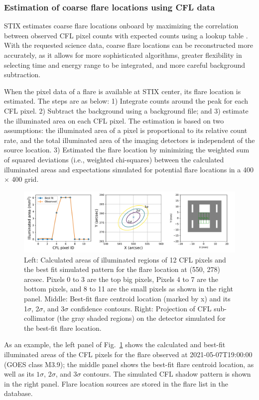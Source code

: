 \documentclass[referee]{aa} %
\begin{document}
\subsubsection{Estimation of coarse flare locations using CFL data}
STIX estimates coarse flare locations onboard by 
maximizing the correlation between observed CFL pixel counts with expected counts using a lookup table \cite{stix2020}. 
With the requested science data, coarse flare locations can be reconstructed more accurately, as it allows for more sophisticated algorithms, greater flexibility in selecting time and energy range to be integrated, and more careful background subtraction.

When the pixel data of a flare is available at STIX center, its flare location is estimated. The steps are as below: 
1) Integrate counts around the peak for each CFL pixel. 
2) Subtract the background using a background file; and 3) estimate the illuminated area on each CFL pixel.  The estimation is based on two assumptions:  the illuminated area of a pixel is proportional to its relative count rate, and the total illuminated area of the imaging detectors is independent of the source location.
3) Estimated the flare location by minimizing the weighted sum of squared deviations (i.e., weighted chi-squares) between the calculated illuminated areas and expectations simulated for potential flare locations in a 400 $\times$ 400 grid.
\begin{figure}
  \centering
  \includegraphics[width=0.95\linewidth]{figures/cflMay07.pdf}
  \caption{
   Left: Calculated areas of illuminated regions of 12 CFL pixels and the best fit simulated pattern for the flare location at (550, 278) arcsec. Pixels 0 to 3 are the top big pixels, Pixels 4 to 7 are the bottom pixels, and 8 to 11 are the small pixels as shown in the right panel.
   Middle: Best-fit flare centroid location (marked by x) and its 1$\sigma$, 2$\sigma$, and 3$\sigma$ confidence contours. Right: Projection of CFL sub-collimator (the gray shaded regions) on the detector simulated for the best-fit flare location. }
  \label{fig:cfl}
\end{figure}
As an example, the left panel of Fig.~\ref{fig:cfl} shows the calculated and best-fit illuminated areas of the CFL pixels for the flare observed at 2021-05-07T19:00:00 (GOES class M3.9);  the middle panel shows the best-fit flare centroid location, as well as its $1\sigma$, $2\sigma$, and $3\sigma$ contours. 
The simulated CFL shadow pattern is shown in the right panel. 
Flare location sources are stored in the flare list in the database. 
\end{document}
